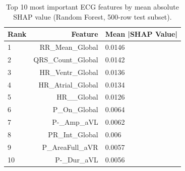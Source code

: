 \begin{table}[htbp]
  \centering
  \caption{Top 10 most important ECG features by mean absolute SHAP value (Random Forest, 500-row test subset).}
  \label{tab:p1_shap}
  \begin{tabular}{lrl}
  \toprule
  Rank & Feature & Mean |SHAP Value| \\
  \midrule
  1 & RR_Mean_Global & 0.0146 \\
  2 & QRS_Count_Global & 0.0142 \\
  3 & HR_Ventr_Global & 0.0136 \\
  4 & HR_Atrial_Global & 0.0134 \\
  5 & HR__Global & 0.0126 \\
  6 & P_On_Global & 0.0064 \\
  7 & P-_Amp_aVL & 0.0062 \\
  8 & PR_Int_Global & 0.006 \\
  9 & P_AreaFull_aVR & 0.0057 \\
  10 & P-_Dur_aVL & 0.0056 \\
  \bottomrule
  \end{tabular}
\end{table}
